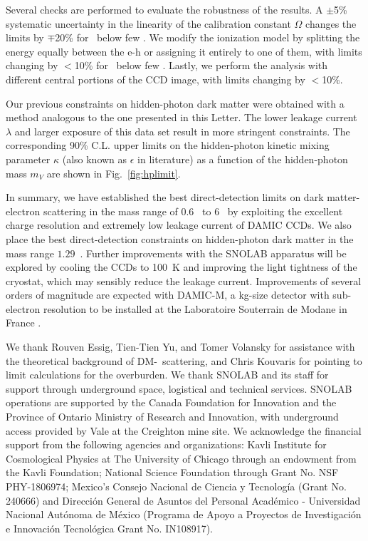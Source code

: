 \documentclass[aps,amsmath,amssymb,twocolumn,superscriptaddress,nofootinbib]{revtex4-1}
\begin{document}
Several checks are performed to evaluate the robustness of the results. A $\pm$5\% systematic uncertainty in the linearity of the calibration constant $\Omega$ changes the limits by $\mp$20\% for \mass\ below few \mevm.  We modify the ionization model by splitting the energy equally between the e-h or assigning it entirely to one of them, with limits changing by $<$10\% for \mass\ below few \mevm. Lastly, we perform the analysis with different central portions of the CCD image, with limits changing by $<$10\%. 

Our previous constraints on hidden-photon dark matter \cite{aguilar:2017} were obtained with a method analogous to the one presented in this Letter. The lower leakage current $\lambda$ and larger exposure of this data set result in more stringent constraints. The corresponding 90\% C.L. upper limits on the hidden-photon kinetic mixing parameter $\kappa$ (also known as $\epsilon$ in literature) as a function of the hidden-photon mass $m_V$ are shown in Fig.~\ref{fig:hplimit}. 

In summary, we have established the best direct-detection limits on dark matter-electron scattering in the mass range of 0.6 \mevm\ to 6 \mevm\ by exploiting the excellent charge resolution and extremely low leakage current of DAMIC CCDs. We also place the best direct-detection constraints on hidden-photon dark matter in the mass range $1.2$\textendash$9$~\evm. Further improvements with the SNOLAB apparatus will be explored by cooling the CCDs to 100~K and improving the light tightness of the cryostat, which may sensibly reduce the leakage current. Improvements of several orders of magnitude are expected with DAMIC-M, a kg-size detector with sub-electron resolution to be installed at the Laboratoire Souterrain de Modane in France \cite{settimo:2018}.  
	
We thank Rouven Essig, Tien-Tien Yu, and Tomer Volansky for assistance with the theoretical background of DM-\electron\ scattering, and Chris Kouvaris for pointing to limit calculations for the overburden. We thank SNOLAB and its staff for support through underground space, logistical and technical services. SNOLAB operations are supported by the Canada Foundation for Innovation and the Province of Ontario Ministry of Research and Innovation, with underground access provided by Vale at the Creighton mine site. We acknowledge the financial support from the following agencies and organizations: Kavli Institute for Cosmological Physics at The University of Chicago through an endowment from the Kavli Foundation; National Science Foundation through Grant No. NSF PHY-1806974; Mexico's Consejo Nacional de Ciencia y Tecnolog\'ia (Grant No. 240666) and Direcci\'on General de Asuntos del Personal Acad\'emico - Universidad Nacional Aut\'onoma 
de M\'exico (Programa de Apoyo a  Proyectos de Investigaci\'on e Innovaci\'on Tecnol\'ogica Grant No. IN108917).


\end{document}
